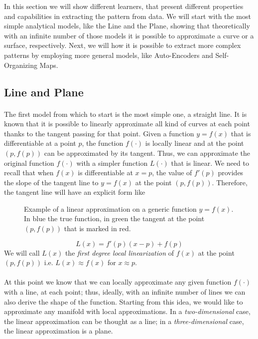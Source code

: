 In this section we will show different learners, that present different properties and capabilities in extracting the pattern from data. We will start with the most simple analytical models, like the Line and the Plane, showing that theoretically with an infinite number of those models it is possible to approximate a curve or a surface, respectively. \newline
Next, we will how it is possible to extract more complex patterns by employing more general models, like Auto-Encoders and Self-Organizing Maps.

\subsection{Line and Plane}
\paragraph{}
The first model from which to start is the most simple one, a straight line. It is known \cite{tangent_line_approx} that it is possible to linearly approximate all kind of curves at each point thanks to the tangent passing for that point. \newline
Given a function $y = f(x)$ that is differentiable at a point $p$, the function $f(\cdot)$ is locally linear and at the point $(p, f(p))$ can be approximated by its tangent. Thus, we can approximate the original function $f(\cdot)$ with a simpler function $L(\cdot)$ that is linear. We need to recall that when $f(x)$ is differentiable at $x = p$, the value of $f'(p)$ provides the slope of the tangent line to $y = f(x)$ at the point $(p, f(p))$. Therefore, the tangent line will have an explicit form like 
\begin{figure}[ht]
    \label{fig:linear_approx}
    \centering
    
    \caption{Example of a linear approximation on a generic function $y = f(x)$. In blue the true function, in green the tangent at the point $(p, f(p))$ that is marked in red.}
\end{figure}
\begin{equation}
    L(x) = f'(p)(x-p) + f(p)
\end{equation}
We will call $L(x)$ the \textit{first degree local linearization} of $f(x)$ at the point $(p, f(p))$ i.e. $L(x) \approx f(x)$ for $x \approx p$.

\paragraph{}
At this point we know that we can locally approximate any given function $f(\cdot)$ with a line, at each point; thus, ideally, with an infinite number of lines we can also derive the shape of the function. Starting from this idea, we would like to approximate any manifold with local approximations. In a \textit{two-dimensional} case, the linear approximation can be thought as a line; in a \textit{three-dimensional} case, the linear approximation is a plane.

